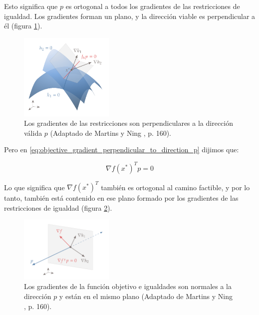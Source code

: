 Esto significa que $p$ es ortogonal a todos los gradientes de las
restricciones de igualdad. Los gradientes forman un plano, y la dirección
viable es perpendicular a él (figura \ref{fig:constraints_jacobian}).

\begin{figure}[h]
	\centering
	\includegraphics[width=0.4\textwidth]{./capitulos/metodologia/images/constraints_jacobian.png}
	\caption{Los gradientes de las restricciones son perpendiculares a la dirección válida $p$ (Adaptado de Martins y Ning \cite{mdobook}, p. 160).}
	\label{fig:constraints_jacobian}
\end{figure}

Pero en \eqref{eq:objective_gradient_perpendicular_to_direction_p} dijimos que:

\begin{equation}
	\nabla f(x^*)^T p = 0
\end{equation}

Lo que significa que $\nabla f(x^*)^T$ también es ortogonal al camino
factible, y por lo tanto, también está contenido en ese plano formado por los
gradientes de las restricciones de igualdad (figura \ref{fig:gradients_on_the_same_plane}).

\begin{figure}[h]
	\centering
	\includegraphics[width=0.4\textwidth]{./capitulos/metodologia/images/gradients_on_the_same_plane.png}
	\caption{Los gradientes de la función objetivo e igualdades son normales a la
		dirección $p$ y están en el mismo plano (Adaptado de Martins y Ning
		\cite{mdobook}, p. 160).}
	\label{fig:gradients_on_the_same_plane}
\end{figure}

